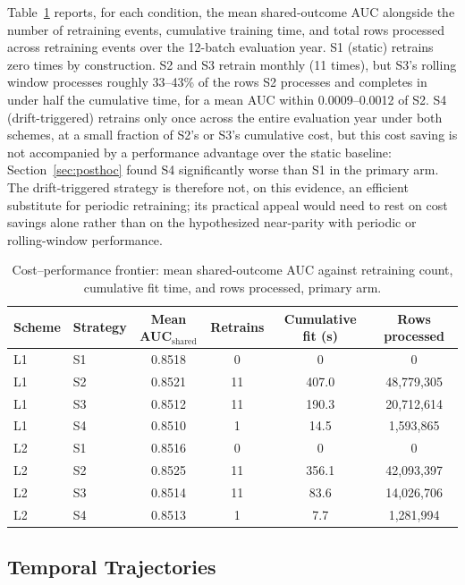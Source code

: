 Table~\ref{tab:cost-frontier} reports, for each condition, the mean shared-outcome AUC alongside the number of retraining events, cumulative training time, and total rows processed across retraining events over the 12-batch evaluation year. S1 (static) retrains zero times by construction. S2 and S3 retrain monthly (11 times), but S3's rolling window processes roughly 33--43\% of the rows S2 processes and completes in under half the cumulative time, for a mean AUC within 0.0009--0.0012 of S2. S4 (drift-triggered) retrains only once across the entire evaluation year under both schemes, at a small fraction of S2's or S3's cumulative cost, but this cost saving is not accompanied by a performance advantage over the static baseline: Section~\ref{sec:posthoc} found S4 significantly worse than S1 in the primary arm. The drift-triggered strategy is therefore not, on this evidence, an efficient substitute for periodic retraining; its practical appeal would need to rest on cost savings alone rather than on the hypothesized near-parity with periodic or rolling-window performance.

\begin{table}[htbp]
  \centering
  \footnotesize
  \begin{tabular}{l l c c c c}
    \toprule
    Scheme & Strategy & Mean AUC$_{\text{shared}}$ & Retrains & Cumulative fit (s) & Rows processed \\
    \midrule
    L1 & S1 & 0.8518 & 0 & 0 & 0 \\
    L1 & S2 & 0.8521 & 11 & 407.0 & 48{,}779{,}305 \\
    L1 & S3 & 0.8512 & 11 & 190.3 & 20{,}712{,}614 \\
    L1 & S4 & 0.8510 & 1 & 14.5 & 1{,}593{,}865 \\
    L2 & S1 & 0.8516 & 0 & 0 & 0 \\
    L2 & S2 & 0.8525 & 11 & 356.1 & 42{,}093{,}397 \\
    L2 & S3 & 0.8514 & 11 & 83.6 & 14{,}026{,}706 \\
    L2 & S4 & 0.8513 & 1 & 7.7 & 1{,}281{,}994 \\
    \bottomrule
  \end{tabular}
  \caption{Cost--performance frontier: mean shared-outcome AUC against retraining count, cumulative fit time, and rows processed, primary arm.}
  \label{tab:cost-frontier}
\end{table}

\subsection{Temporal Trajectories}

